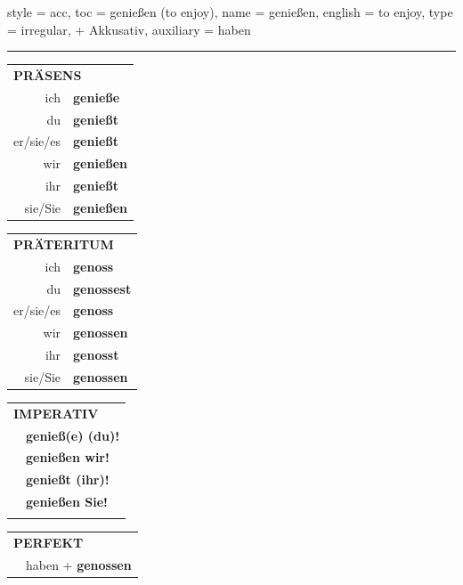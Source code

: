 \begin{verbentry}{
  style = {acc},
  toc = {genießen (to enjoy)},
  name = {genießen},
  english = {to enjoy},
  type = {irregular, + Akkusativ},
  auxiliary = {haben}
}
 
    
     \vspace{5pt}

    \hrule
    
    \vspace{5pt}

  \begin{tabular}{rl}
     \multicolumn{2}{l}{\textbf{PRÄSENS} }\\
    ich & \textbf{genieße}\\
    du & \textbf{genießt}\\
    er/sie/es & \textbf{genießt}\\
    wir & \textbf{genießen}\\
    ihr & \textbf{genießt}\\
    sie/Sie & \textbf{genießen}\\
  \end{tabular}
  \hfill
     \begin{tabular}{rl}
    \multicolumn{2}{l}{\textbf{PRÄTERITUM} }\\
    ich & \textbf{genoss}\\
    du & \textbf{genossest}\\
    er/sie/es & \textbf{genoss}\\
    wir & \textbf{genossen}\\
    ihr & \textbf{genosst}\\
    sie/Sie & \textbf{genossen}\\
  \end{tabular}
  \hfill
  \begin{tabular}{rl}
     \multicolumn{2}{l}{\textbf{IMPERATIV} }\\
   & \textbf{genieß(e) (du)!}\\
   & \textbf{genießen wir!}\\
   & \textbf{genießt (ihr)!}\\
   & \textbf{genießen Sie!}\\
   & \vspace{10pt}
  \end{tabular}

    \vspace{10pt}

 \begin{tabular}{rl}
     \multicolumn{2}{l}{\textbf{PERFEKT}}\\
  &  haben + \textbf{genossen}\\
  \end{tabular}
\hfill
   \begin{tabular}{rl}
   

\end{tabular}
\end{verbentry}
